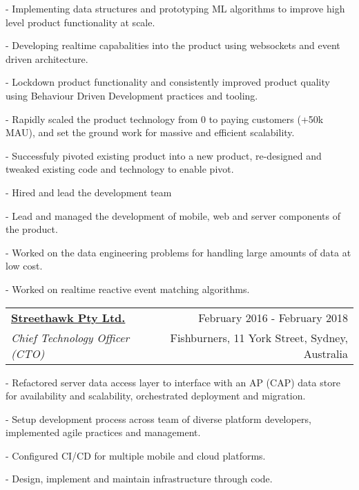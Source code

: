 \documentclass[10pt]{article}
\makeatletter
\newcommand{\employer}[4]{ 
        \vspace*{6pt}
	\begin{tabular*}{\textwidth}{l@{\extracolsep{\fill}}r}
	\textbf{#1} & #2 \\
                #3  & #4 \\ 
	\end{tabular*}
}
\newenvironment{achievements}{
        \vspace{-0pt}
        \begin{list}
        {}
        {\topsep 0pt \itemsep -3pt}
}
{
        \end{list}
}
\makeatother
\begin{document}
	\begin{achievements}
      \item[-] Implementing data structures and prototyping ML algorithms to improve high level product functionality at scale.
      \item[-] Developing realtime capabalities into the product using websockets and event driven architecture.
      \item[-] Lockdown product functionality and consistently improved product quality using Behaviour Driven Development practices and tooling.
      \item[-] Rapidly scaled the product technology from 0 to paying customers (+50k MAU), and set the ground work for massive and efficient scalability. 
      \item[-] Successfuly pivoted existing product into a new product, re-designed and tweaked existing code and technology to enable pivot.
      \item[-] Hired and lead the development team
      \item[-] Lead and managed the development of mobile, web and server components of the product.
      \item[-] Worked on the data engineering problems for handling large amounts of data at low cost.
      \item[-] Worked on realtime reactive event matching algorithms.
    \end{achievements}

\employer{\href{http://www.streethawk.com/}{Streethawk Pty Ltd.}}{February 2016 - February 2018}{\emph{Chief Technology Officer (CTO)}} {Fishburners, 11 York Street, Sydney, Australia}
	\begin{achievements}
                \item[-] Refactored server data access layer to interface with an AP (CAP) data store for availability and scalability, orchestrated deployment and migration.
                \item[-] Setup development process across team of diverse platform developers, implemented agile practices and management.
                \item[-] Configured CI/CD for multiple mobile and cloud platforms.
                \item[-] Design, implement and maintain infrastructure through code.
    \end{achievements}
\end{document}

